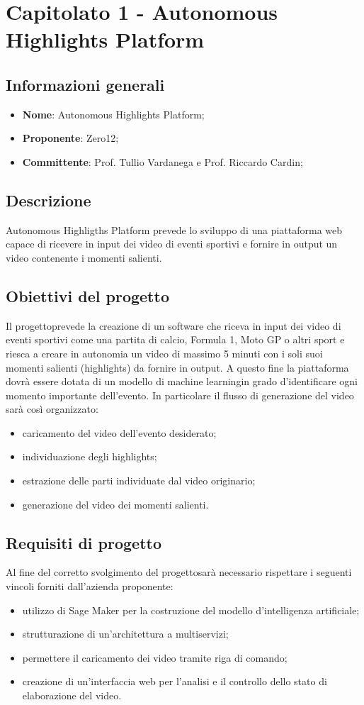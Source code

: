 \section{Capitolato 1 - Autonomous Highlights Platform}
\subsection{Informazioni generali}
\begin{itemize}
	\item \textbf{Nome}: Autonomous Highlights Platform;
	\item \textbf{Proponente}: Zero12;
	\item \textbf{Committente}: Prof. Tullio Vardanega e Prof. Riccardo Cardin;
\end{itemize}
\subsection{Descrizione}
Autonomous Highligths Platform prevede lo sviluppo di una piattaforma web capace di ricevere in input dei video di eventi sportivi e fornire in output un video contenente i momenti salienti.
\subsection{Obiettivi del progetto}
Il progetto\glosp prevede la creazione di un software che riceva in input dei video di eventi sportivi come una partita di calcio, Formula 1, Moto GP o altri sport e riesca a creare in autonomia un video di massimo 5 minuti con i soli suoi momenti salienti (highlights) da fornire in output. A questo fine la piattaforma dovrà essere dotata di un modello di machine learning\glosp in grado d'identificare ogni momento importante dell’evento.
In particolare il flusso di generazione del video sarà così organizzato:
\begin{itemize}
	\item caricamento del video dell'evento desiderato;
	\item individuazione degli highlights;
	\item estrazione delle parti individuate dal video originario;
	\item generazione del video dei momenti salienti.
\end{itemize}
\subsection{Requisiti di progetto}
Al fine del corretto svolgimento del progetto\glosp sarà necessario rispettare i seguenti vincoli forniti dall'azienda proponente:
\begin{itemize}
	\item utilizzo di Sage Maker per la costruzione del modello d'intelligenza artificiale\glo;
	\item strutturazione di un'architettura a multiservizi\glo;
	\item permettere il caricamento dei video tramite riga di comando;
	\item creazione di un'interfaccia web per l'analisi e il controllo dello stato di elaborazione del video.
\end{itemize}
